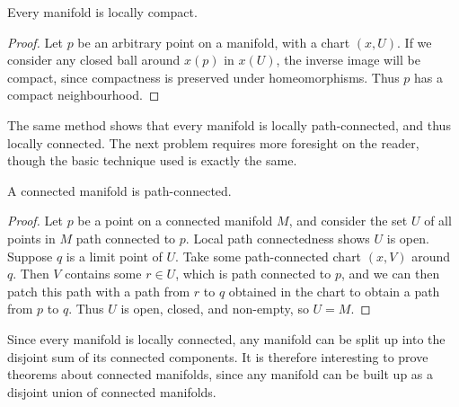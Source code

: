 \begin{theorem}
    Every manifold is locally compact.
\end{theorem}
\begin{proof}
    Let $p$ be an arbitrary point on a manifold, with a chart $(x,U)$. If we consider any closed ball around $x(p)$ in $x(U)$, the inverse image will be compact, since compactness is preserved under homeomorphisms. Thus $p$ has a compact neighbourhood.
\end{proof}

The same method shows that every manifold is locally path-connected, and thus locally connected. The next problem requires more foresight on the reader, though the basic technique used is exactly the same.

\begin{theorem}
    A connected manifold is path-connected.
\end{theorem}
\begin{proof}
    Let $p$ be a point on a connected manifold $M$, and consider the set $U$ of all points in $M$ path connected to $p$. Local path connectedness shows $U$ is open. Suppose $q$ is a limit point of $U$. Take some path-connected chart $(x,V)$ around $q$. Then $V$ contains some $r \in U$, which is path connected to $p$, and we can then patch this path with a path from $r$ to $q$ obtained in the chart to obtain a path from $p$ to $q$. Thus $U$ is open, closed, and non-empty, so $U = M$.
\end{proof}

Since every manifold is locally connected, any manifold can be split up into the disjoint sum of its connected components. It is therefore interesting to prove theorems about connected manifolds, since any manifold can be built up as a disjoint union of connected manifolds.

